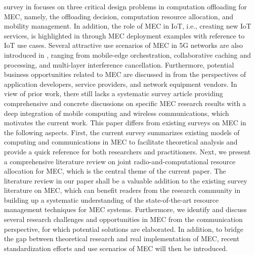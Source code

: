 \documentclass[journal]{IEEEtran}
\begin{document}
{{survey in \cite{mach2017mobile} focuses on three critical design problems in computation offloading for MEC, namely, the offloading decision, computation resource allocation, and mobility management. In addition, the role of MEC in IoT, i.e., creating  new IoT services, is highlighted in \cite{sabella2016mobile} through MEC deployment examples with reference to IoT use cases. Several attractive use scenarios of MEC in 5G networks are also introduced in \cite{tran2016collaborativeNewPara}, ranging from mobile-edge orchestration, collaborative caching and processing, and multi-layer interference cancellation. Furthermore, potential business opportunities related to MEC are discussed in \cite{ahmed2017mobile} from the perspectives of application developers, service providers, and network equipment vendors. In view of prior work, there still lacks a systematic survey article providing comprehensive and concrete discussions on specific MEC research results with a deep integration of mobile computing and wireless communications, which motivates the current work. This paper differs from existing surveys on MEC in the following aspects. First, the current survey summarizes existing models of computing and communications in MEC to facilitate theoretical analysis and provide a quick reference for both researchers and practitioners. Next, we present a comprehensive literature review on joint radio-and-computational resource allocation for MEC, which is the central theme of the current paper. The literature review in our paper shall be a valuable addition to the existing survey literature on MEC, which can benefit readers from the research community in building up a systematic understanding of the state-of-the-art resource management techniques for MEC systems. Furthermore, we identify and discuss several research challenges and opportunities in MEC from the communication perspective, for which potential solutions are elaborated. In addition, to bridge the gap between theoretical research and real implementation of MEC, recent standardization efforts and use scenarios of MEC will then be introduced.}}
\end{document}
